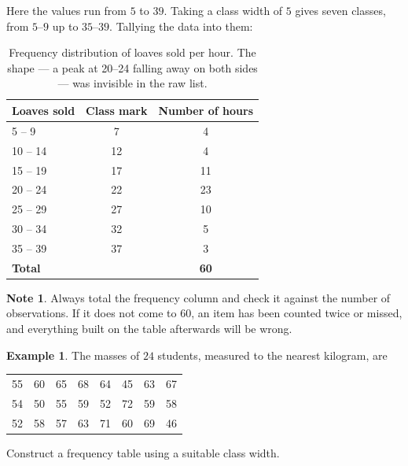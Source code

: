\documentclass[11pt,a4paper]{article}
\theoremstyle{definition}
\newtheorem{example}[thm]{Example}
\newtheorem{note}[thm]{Note}
\begin{document}
Here the values run from $5$ to $39$. Taking a class width of $5$ gives seven classes,
from $5$--$9$ up to $35$--$39$. Tallying the data into them:

\begin{table}[H]
\centering
\begin{tabular}{|l|c|c|}
\hline
Loaves sold & Class mark & Number of hours\\
\hline
5 -- 9 & 7 & 4\\
10 -- 14 & 12 & 4\\
15 -- 19 & 17 & 11\\
20 -- 24 & 22 & 23\\
25 -- 29 & 27 & 10\\
30 -- 34 & 32 & 5\\
35 -- 39 & 37 & 3\\
\hline
\textbf{Total} & & \textbf{60}\\
\hline
\end{tabular}
\caption{Frequency distribution of loaves sold per hour. The shape --- a peak at 20--24 falling away on both sides --- was invisible in the raw list.}
\end{table}

\begin{note}
Always total the frequency column and check it against the number of observations. If
it does not come to $60$, an item has been counted twice or missed, and everything built
on the table afterwards will be wrong.
\end{note}

\begin{example}
The masses of $24$ students, measured to the nearest kilogram, are

\begin{table}[H]
\centering
\begin{tabular}{cccccccc}
55 & 60 & 65 & 68 & 64 & 45 & 63 & 67\\
54 & 50 & 55 & 59 & 52 & 72 & 59 & 58\\
52 & 58 & 57 & 63 & 71 & 60 & 69 & 46\\
\end{tabular}
\end{table}

Construct a frequency table using a suitable class width.
\end{example}
\end{document}
